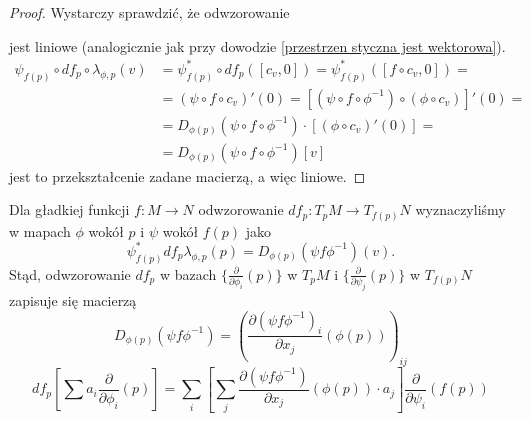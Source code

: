\begin{proof}
  Wystarczy sprawdzić, że odwzorowanie

  \begin{center}\end{center}
  jest liniowe (analogicznie jak przy dowodzie \ref{przestrzen styczna jest wektorowa}). 
  \begin{align*}
    \psi_{f(p)}\circ df_p\circ\lambda_{\phi, p}(v)&=\psi_{f(p)}^*\circ df_p([c_v, 0])=\psi_{f(p)}^*([f\circ c_v, 0])=\\
                                                  &=(\psi\circ f\circ c_v)'(0)=[(\psi\circ f\circ \phi^{-1})\circ(\phi\circ c_v)]'(0)=\\
                                                  &=D_{\phi(p)}(\psi\circ f\circ\phi^{-1})\cdot[(\phi\circ c_v)'(0)]=\\
                                                  &=D_{\phi(p)}(\psi\circ f\circ \phi^{-1})[v]
  \end{align*}
  jest to przekształcenie zadane macierzą, a więc liniowe.
\end{proof}

Dla gładkiej funkcji $f:M\to N$ odwzorowanie $df_p:T_pM\to T_{f(p)}N$ wyznaczyliśmy w mapach $\phi$ wokół $p$ i $\psi$ wokół $f(p)$ jako
$$\psi_{f(p)}^*df_p\lambda_{\phi, p}(p)=D_{\phi(p)}(\psi f\phi^{-1})(v).$$
Stąd, odwzorowanie $df_p$ w bazach $\{\frac{\partial}{\partial\phi_i}(p)\}$ w $T_pM$ i $\{\frac{\partial}{\partial\psi_j}(p)\}$ w $T_{f(p)}N$ zapisuje się macierzą
$$D_{\phi(p)}(\psi f\phi^{-1})=\left(\frac{\partial(\psi f\phi^{-1})_i}{\partial x_j}(\phi(p))\right)_{ij}$$
$$df_p\left[\sum a_i\frac{\partial}{\partial\phi_i}(p)\right]=\sum_i\left[\sum_j\frac{\partial(\psi f\phi^{-1})}{\partial x_j}(\phi(p))\cdot a_j\right]\frac{\partial}{\partial\psi_i}(f(p)) $$

